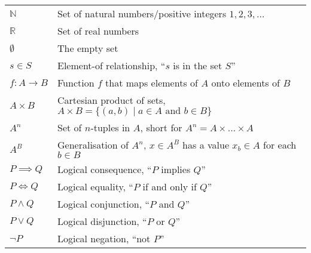 
\begin{tabular}{ll}
$\mathbb N$ & Set of natural numbers/positive integers $1,2,3,\dots$\\
$\mathbb R$ & Set of real numbers\\
$\emptyset$ & The empty set\\[1em]
$s\in S$    & Element-of relationship, ``$s$ is in the set $S$''\\
$f:A\rightarrow B$ & Function $f$ that maps elements of $A$ onto elements of $B$\\
$A\times B$ & Cartesian product of sets, $A\times B=\{(a,b)\mid a\in A\text{ and }b\in B\}$\\
$A^n$           & Set of $n$-tuples in $A$, short for $A^n=A\times\dots\times A$\\
$A^B$     & Generalisation of $A^n$, $x\in A^B$ has a value $x_b\in A$ for each $b\in B$\\[1em]
$P\implies Q$ & Logical consequence, ``$P$ implies $Q$''\\
$P\iff Q$     & Logical equality, ``$P$ if and only if $Q$''\\
$P\mathrel\land Q$ & Logical conjunction, ``$P$ and $Q$''\\
$P\mathrel\lor Q$ & Logical disjunction, ``$P$ or $Q$''\\
$\neg P$          & Logical negation, ``not $P$''
\end{tabular}